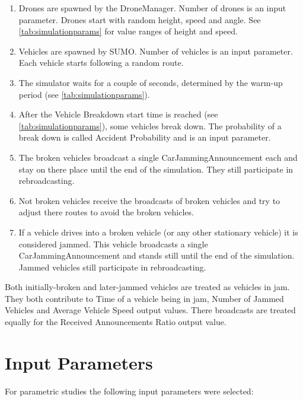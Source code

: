 \documentclass[]{nsm-thesis}
\begin{document}
\begin{enumerate}
	\item Drones are spawned by the DroneManager. Number of drones is an input parameter. Drones start with random height, speed and angle. See \cref{tab:simulationparams} for value ranges of height and speed.
	\item Vehicles are spawned by SUMO. Number of vehicles is an input parameter. Each vehicle starts following a random route.
	\item The simulator waits for a couple of seconds, determined by the warm-up period (see \cref{tab:simulationparams}).
	\item After the Vehicle Breakdown start time is reached (see \cref{tab:simulationparams}), some vehicles break down. The probability of a break down is called Accident Probability and is an input parameter.
  	\item The broken vehicles broadcast a single CarJammingAnnouncement each and stay on there place until the end of the simulation. They still participate in rebroadcasting.
	\item Not broken vehicles receive the broadcasts of broken vehicles and try to adjust there routes to avoid the broken vehicles.
	\item If a vehicle drives into a broken vehicle (or any other stationary vehicle) it is considered jammed. This vehicle broadcasts a single CarJammingAnnouncement and stands still until the end of the simulation. Jammed vehicles still participate in rebroadcasting.
\end{enumerate}

Both initially-broken and later-jammed vehicles are treated as vehicles in jam. They both contribute to Time of a vehicle being in jam, Number of Jammed Vehicles and Average Vehicle Speed output values. There broadcasts are treated equally for the Received Announcements Ratio output value. 

\section{Input Parameters}

For parametric studies the following input parameters were selected:
\end{document}
